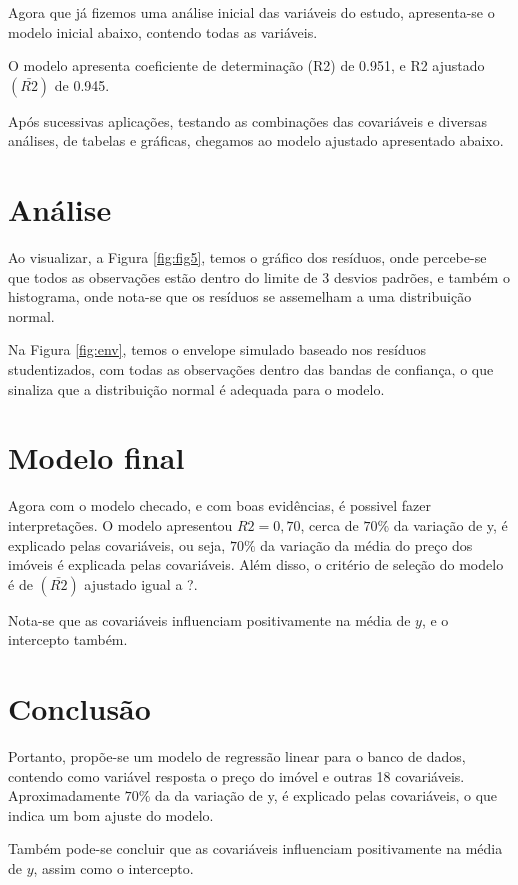 \documentclass[
]{article}
\begin{document}
Agora que já fizemos uma análise inicial das variáveis do estudo, apresenta-se o modelo inicial abaixo, contendo todas as variáveis.

O modelo apresenta coeficiente de determinação (R2) de 0.951, e R2 ajustado \((\bar{R2})\) de 0.945.

Após sucessivas aplicações, testando as combinações das covariáveis e diversas análises, de tabelas e gráficas, chegamos ao modelo ajustado apresentado abaixo.

\hypertarget{anuxe1lise}{%
\section{Análise}\label{anuxe1lise}}

Ao visualizar, a Figura \ref{fig:fig5}, temos o gráfico dos resíduos, onde percebe-se que todos as observações estão dentro do limite de 3 desvios padrões, e também o histograma, onde nota-se que os resíduos se assemelham a uma distribuição normal.

Na Figura \ref{fig:env}, temos o envelope simulado baseado nos resíduos studentizados, com todas as observações dentro das bandas de confiança, o que sinaliza que a distribuição normal é adequada para o modelo.

\hypertarget{modelo-final}{%
\section{Modelo final}\label{modelo-final}}

Agora com o modelo checado, e com boas evidências, é possivel fazer interpretações.
O modelo apresentou \(R2=0,70\), cerca de \(70\%\) da variação de y, é
explicado pelas covariáveis, ou seja, \(70\%\) da variação da média do preço dos imóveis é explicada pelas covariáveis. Além disso, o critério de seleção do modelo é de \((\bar{R2})\) ajustado igual a ?.

Nota-se que as covariáveis influenciam positivamente na média de \(y\), e o intercepto também.

\hypertarget{conclusuxe3o}{%
\section{Conclusão}\label{conclusuxe3o}}

Portanto, propõe-se um modelo de regressão linear para o banco de dados, contendo como variável resposta o preço do imóvel e outras 18 covariáveis. Aproximadamente \(70\%\) da da variação de y, é explicado pelas covariáveis, o que indica um bom ajuste do modelo.

Também pode-se concluir que as covariáveis influenciam positivamente na média de \(y\), assim como o intercepto.
\end{document}
